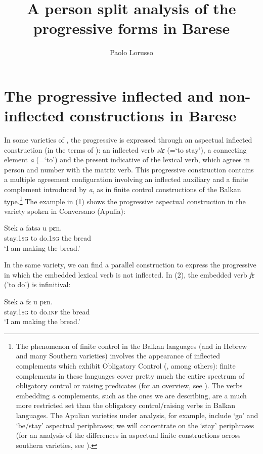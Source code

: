 \documentclass[output=paper]{langsci/langscibook}
\author{Paolo Lorusso\affiliation{IUSS, Pavia}}
\title{A person split analysis of the progressive forms in Barese}
\begin{document}
\section{The progressive inflected and non-inflected constructions in Barese}%

In some varieties of , the progressive is expressed through an aspectual inflected construction (in the terms of \citealt{Manzini2005}): an inflected  verb \textit{stɛ} (=‘to stay’), a connecting element \textit{a} (=‘to’) and the present indicative of the lexical verb, which agrees in person and number with the matrix verb. This progressive construction contains a multiple agreement configuration involving an inflected auxiliary and a finite complement introduced by \textit{a}, as in finite control constructions of the Balkan type.\footnote{The phenomenon of finite control in the Balkan languages (and in Hebrew and many Southern  varieties) involves the appearance of inflected  complements which exhibit Obligatory Control (\citealt{Landau2004}, among others): finite complements in these languages cover pretty much the entire spectrum of obligatory control or raising predicates (for an overview, see \citealt{Ledgeway2015,Manzini2017}). The verbs embedding \textit{a} complements, such as the ones we are describing, are a much more restricted set than the obligatory control\slash raising verbs in Balkan languages. The Apulian varieties under analysis, for example, include ‘go’ and ‘be\slash stay’ aspectual periphrases; we will concentrate on the ‘stay’ periphrases (for an analysis of the differences in aspectual finite constructions across southern  varieties, see \citealt{Manzini2017}).}  The example in (1) shows the progressive aspectual construction in the variety spoken in Conversano (Apulia): 

\ea%
    \label{ex:lorusso:1}
    \gll Stek    a   fatsə    u    pɛn.     \\
         stay.\textsc{1sg}   to  do.\textsc{1sg} the    bread\\
    \glt ‘I am making the bread.’
    \z


In the same variety, we can find a parallel construction to express the progressive in which the embedded lexical verb is not inflected. In (2), the embedded verb \textit{fɛ} ('to do') is infinitival: 

\ea%
    \label{ex:lorusso:2}
    \gll Stek     a  fɛ     u    pɛn.      \\
         stay.\textsc{1sg} to   do.\textsc{inf}    the    bread\\
    \glt ‘I am making the bread.’
    \z
\end{document}
